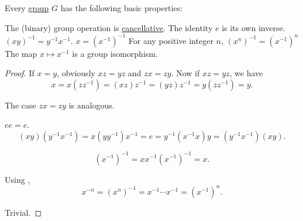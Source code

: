 \begin{proposition}\label{thm:def:group}
  Every \hyperref[def:group]{group} \( G \) has the following basic properties:
  \begin{thmenum}
     The (binary) group operation is \hyperref[def:binary_operation/cancellative]{cancellative}.
     The identity \( e \) is its own inverse.
     \( (xy)^{-1} = y^{-1} x^{-1} \).
     \( x = (x^{-1})^{-1} \)
     For any positive integer \( n \), \( (x^n)^{-1} = (x^{-1})^n \)
     The map \( x \mapsto x^{-1} \) is a group isomorphism.
  \end{thmenum}
\end{proposition}
\begin{proof}
   If \( x = y \), obviously \( xz = yz \) and \( zx = zy \). Now if \( xz = yz \), we have
  \begin{equation*}
    x = x(zz^{-1}) = (xz)z^{-1} = (yz)z^{-1} = y(zz^{-1}) = y.
  \end{equation*}

  The case \( zx = zy \) is analogous.

   \( ee = e \).
  \begin{equation*}
    (xy) (y^{-1} x^{-1})
    =
    x (y y^{-1}) x^{-1}
    =
    e
    =
    y^{-1} (x^{-1} x) y
    =
    (y^{-1} x^{-1}) (xy).
  \end{equation*}

  \begin{equation*}
    (x^{-1})^{-1}
    =
    x x^{-1} (x^{-1})^{-1}
    =
    x.
  \end{equation*}

   Using ,
  \begin{equation*}
    x^{-n}
    =
    (x^n)^{-1}
    =
    x^{-1} \cdots x^{-1}
    =
    (x^{-1})^n.
  \end{equation*}

   Trivial.
\end{proof}

